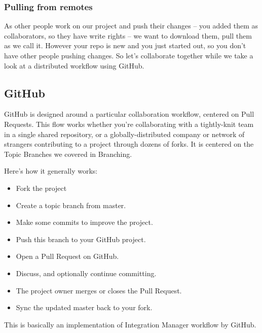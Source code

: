 \documentclass[12pt,a4]{article}
\begin{document}
\subsubsection{Pulling from remotes}
As other people work on our project and push their changes -- you added them as
collaborators, so they have write rights -- we want to download them, pull them
as we call it. However your repo is new and you just started out, so you don't
have other people pushing changes. So let's collaborate together while we take a
look at a distributed workflow using GitHub.

\subsection{GitHub}
GitHub is designed around a particular collaboration workflow, centered on Pull
Requests. This flow works whether you’re collaborating with a tightly-knit team
in a single shared repository, or a globally-distributed company or network of
strangers contributing to a project through dozens of forks. It is centered on
the Topic Branches we covered in Branching.

Here’s how it generally works:
\begin{itemize}
\vspace*{-10pt}
\item Fork the project
\vspace*{-5pt}
\item Create a topic branch from master.
\vspace*{-5pt}
\item Make some commits to improve the project.
\vspace*{-5pt}
\item Push this branch to your GitHub project.
\vspace*{-5pt}
\item Open a Pull Request on GitHub.
\vspace*{-5pt}
\item Discuss, and optionally continue committing.
\vspace*{-5pt}
\item The project owner merges or closes the Pull Request.
\vspace*{-5pt}
\item Sync the updated master back to your fork.
\vspace*{-5pt}
\end{itemize}

This is basically an implementation of Integration Manager workflow by GitHub.
\end{document}
